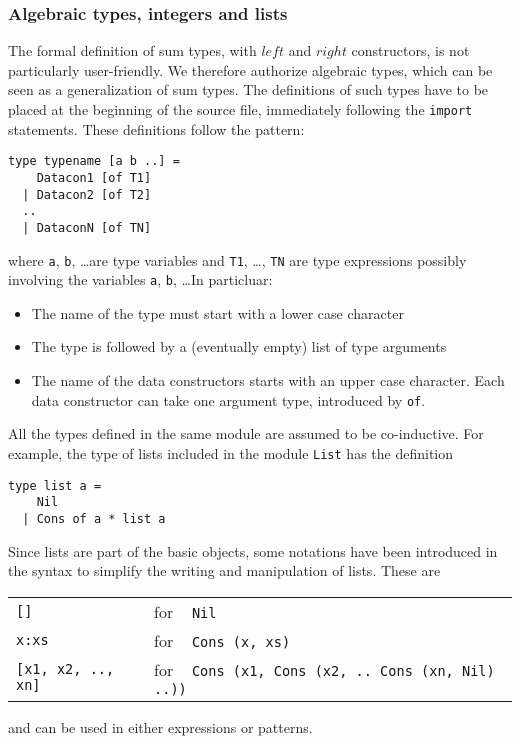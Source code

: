 \subsubsection{Algebraic types, integers and lists}

The formal definition of sum types, with $left$ and $right$ constructors, 
is not particularly user-friendly. We therefore authorize algebraic types, 
which can be seen as a generalization of sum types. The definitions of such 
types have to be placed at the beginning of the source file, immediately 
following the \verb#import# statements. These definitions follow the pattern: 
\begin{verbatim}
type typename [a b ..] =
    Datacon1 [of T1]
  | Datacon2 [of T2]
  ..
  | DataconN [of TN]
\end{verbatim}
where \verb#a#, \verb#b#, \ldots are type variables and \verb#T1#, \ldots, 
\verb#TN# are type expressions possibly involving the variables \verb#a#, 
\verb#b#, \ldots In particluar:
\begin{itemize}
  \item The name of the type must start with a lower case character
  \item The type is followed by a (eventually empty) list of type arguments
  \item The name of the data constructors starts with an upper case  
  character. Each data constructor can take one argument type, introduced 
  by \verb#of#.
\end{itemize}

All the types defined in the same module are assumed to be co-inductive. For 
example, the type of lists included in the module \verb#List# has the 
definition
\begin{verbatim}
type list a =
    Nil
  | Cons of a * list a
\end{verbatim}
Since lists are part of the basic objects, some notations have been introduced in the syntax to simplify the writing and manipulation of lists. 
These are
\begin{center}
\begin{tabular}{ll}
  \verb#[]#               & for ~ \verb#Nil# \\
  \verb#x:xs#             & for ~ \verb#Cons (x, xs)# \\
  \verb#[x1, x2, .., xn]# & for ~ 
                            \verb#Cons (x1, Cons (x2, .. Cons (xn, Nil) ..))#
\end{tabular}
\end{center}
and can be used in either expressions or patterns.

